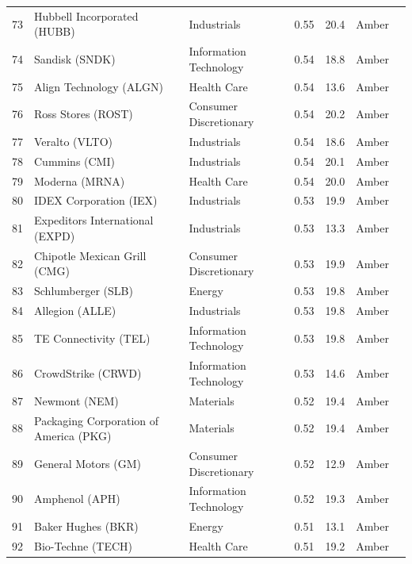 \documentclass[11pt,a4paper]{article}
\begin{document}
{\begin{longtable}{r p{4.4cm} p{2.8cm} r r l l}
73 & Hubbell Incorporated (HUBB) & Industrials & 0.55 & 20.4 & \cellcolor[HTML]{FFEB9C}Amber &  \\
74 & Sandisk (SNDK) & Information Technology & 0.54 & 18.8 & \cellcolor[HTML]{FFEB9C}Amber &  \\
75 & Align Technology (ALGN) & Health Care & 0.54 & 13.6 & \cellcolor[HTML]{FFEB9C}Amber &  \\
76 & Ross Stores (ROST) & Consumer Discretionary & 0.54 & 20.2 & \cellcolor[HTML]{FFEB9C}Amber &  \\
77 & Veralto (VLTO) & Industrials & 0.54 & 18.6 & \cellcolor[HTML]{FFEB9C}Amber &  \\
78 & Cummins (CMI) & Industrials & 0.54 & 20.1 & \cellcolor[HTML]{FFEB9C}Amber &  \\
79 & Moderna (MRNA) & Health Care & 0.54 & 20.0 & \cellcolor[HTML]{FFEB9C}Amber &  \\
80 & IDEX Corporation (IEX) & Industrials & 0.53 & 19.9 & \cellcolor[HTML]{FFEB9C}Amber &  \\
81 & Expeditors International (EXPD) & Industrials & 0.53 & 13.3 & \cellcolor[HTML]{FFEB9C}Amber &  \\
82 & Chipotle Mexican Grill (CMG) & Consumer Discretionary & 0.53 & 19.9 & \cellcolor[HTML]{FFEB9C}Amber &  \\
83 & Schlumberger (SLB) & Energy & 0.53 & 19.8 & \cellcolor[HTML]{FFEB9C}Amber &  \\
84 & Allegion (ALLE) & Industrials & 0.53 & 19.8 & \cellcolor[HTML]{FFEB9C}Amber &  \\
85 & TE Connectivity (TEL) & Information Technology & 0.53 & 19.8 & \cellcolor[HTML]{FFEB9C}Amber &  \\
86 & CrowdStrike (CRWD) & Information Technology & 0.53 & 14.6 & \cellcolor[HTML]{FFEB9C}Amber &  \\
87 & Newmont (NEM) & Materials & 0.52 & 19.4 & \cellcolor[HTML]{FFEB9C}Amber &  \\
88 & Packaging Corporation of America (PKG) & Materials & 0.52 & 19.4 & \cellcolor[HTML]{FFEB9C}Amber &  \\
89 & General Motors (GM) & Consumer Discretionary & 0.52 & 12.9 & \cellcolor[HTML]{FFEB9C}Amber &  \\
90 & Amphenol (APH) & Information Technology & 0.52 & 19.3 & \cellcolor[HTML]{FFEB9C}Amber &  \\
91 & Baker Hughes (BKR) & Energy & 0.51 & 13.1 & \cellcolor[HTML]{FFEB9C}Amber &  \\
92 & Bio-Techne (TECH) & Health Care & 0.51 & 19.2 & \cellcolor[HTML]{FFEB9C}Amber &  \\

\end{longtable}}
\end{document}
